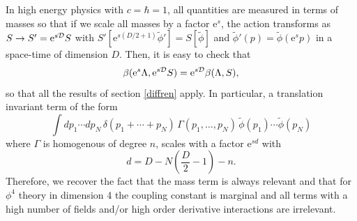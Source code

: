 \documentclass[12pt,here,feynmf]{article}
\begin{document}
In high energy physics with $c=\hbar=1$, all quantities are measured in terms of masses so that if we scale all masses by a factor $\mathrm{e}^{s}$, the action transforms as $S\rightarrow S'=\mathrm{e}^{s{\cal D}} S$ with $S'[\mathrm{e}^{s(D/2+1)}\widetilde{\phi}']=S[\widetilde{\phi}]$ and $\widetilde{\phi}'(p)=\widetilde{\phi}(\mathrm{e}^{s}p)$ in a space-time of dimension $D$. Then, it is easy to check that 
\begin{equation}
\beta(\mathrm{e}^{s}\Lambda,\mathrm{e}^{s{\cal D}} S)=\mathrm{e}^{s{\cal D}}\beta(\Lambda,S),
\end{equation}
 so that all the results of section \ref{diffren} apply. In particular, a translation invariant term of the form
\begin{equation}
\int dp_{1}\cdots dp_{N}\,\delta(p_{1}+\cdots+p_{N})\,\Gamma(p_{1},\dots,p_{N})\,
\widetilde{\phi}(p_{1})\cdots\widetilde{\phi}(p_{N})
\end{equation}
where $\Gamma$ is homogenous of degree $n$, scales with a factor $\mathrm{e}^{sd }$ with
\begin{equation}
d=D-N\left(\frac{D}{2}-1\right)-n.
\end{equation}
Therefore, we recover the fact that the mass term is always relevant and that for $\phi^{4}$ theory in dimension 4 the coupling constant is marginal and all terms with a high number of fields and/or high order derivative interactions are irrelevant.
\end{document}
